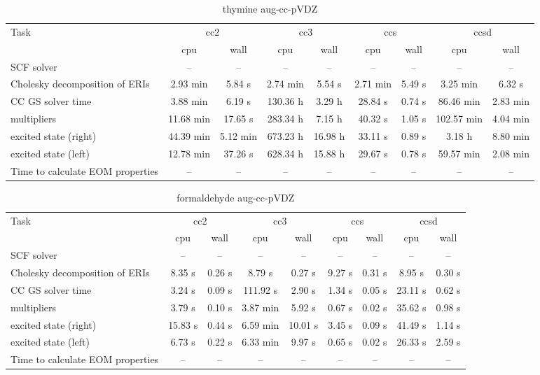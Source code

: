 \documentclass{article}
\begin{document}
\begin{table}
\caption{thymine aug-cc-pVDZ}
\begin{tabular}{lcccccccc}
\toprule
Task & \multicolumn{2}{c}{cc2} & \multicolumn{2}{c}{cc3} & \multicolumn{2}{c}{ccs} & \multicolumn{2}{c}{ccsd}\\
\cmidrule(lr){2-3}\cmidrule(lr){4-5}\cmidrule(lr){6-7}\cmidrule(lr){8-9}
 & cpu & wall & cpu & wall & cpu & wall & cpu & wall\\
\midrule
SCF solver & -- & -- & -- & -- & -- & -- & -- & --\\
Cholesky decomposition of ERIs & 2.93 min & 5.84 s & 2.74 min & 5.54 s & 2.71 min & 5.49 s & 3.25 min & 6.32 s\\
CC GS solver time & 3.88 min & 6.19 s & 130.36 h & 3.29 h & 28.84 s & 0.74 s & 86.46 min & 2.83 min\\
multipliers & 11.68 min & 17.65 s & 283.34 h & 7.15 h & 40.32 s & 1.05 s & 102.57 min & 4.04 min\\
excited state (right) & 44.39 min & 5.12 min & 673.23 h & 16.98 h & 33.11 s & 0.89 s & 3.18 h & 8.80 min\\
excited state (left) & 12.78 min & 37.26 s & 628.34 h & 15.88 h & 29.67 s & 0.78 s & 59.57 min & 2.08 min\\
Time to calculate EOM properties & -- & -- & -- & -- & -- & -- & -- & --\\
\bottomrule
\end{tabular}
\end{table}
\begin{table}
\caption{formaldehyde aug-cc-pVDZ}
\begin{tabular}{lcccccccc}
\toprule
Task & \multicolumn{2}{c}{cc2} & \multicolumn{2}{c}{cc3} & \multicolumn{2}{c}{ccs} & \multicolumn{2}{c}{ccsd}\\
\cmidrule(lr){2-3}\cmidrule(lr){4-5}\cmidrule(lr){6-7}\cmidrule(lr){8-9}
 & cpu & wall & cpu & wall & cpu & wall & cpu & wall\\
\midrule
SCF solver & -- & -- & -- & -- & -- & -- & -- & --\\
Cholesky decomposition of ERIs & 8.35 s & 0.26 s & 8.79 s & 0.27 s & 9.27 s & 0.31 s & 8.95 s & 0.30 s\\
CC GS solver time & 3.24 s & 0.09 s & 111.92 s & 2.90 s & 1.34 s & 0.05 s & 23.11 s & 0.62 s\\
multipliers & 3.79 s & 0.10 s & 3.87 min & 5.92 s & 0.67 s & 0.02 s & 35.62 s & 0.98 s\\
excited state (right) & 15.83 s & 0.44 s & 6.59 min & 10.01 s & 3.45 s & 0.09 s & 41.49 s & 1.14 s\\
excited state (left) & 6.73 s & 0.22 s & 6.33 min & 9.97 s & 0.65 s & 0.02 s & 26.33 s & 2.59 s\\
Time to calculate EOM properties & -- & -- & -- & -- & -- & -- & -- & --\\
\bottomrule
\end{tabular}
\end{table}
\end{document}
